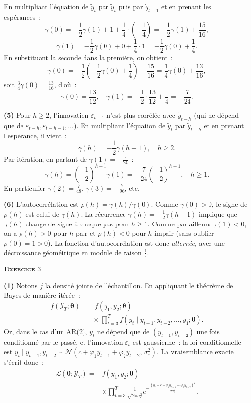 \documentclass[11pt,a4paper,notitlepage]{article}
\newcommand{\exercice}[1]{\textsc{\textbf{Exercice}} #1}
\newcommand{\question}[1]{\textbf{(#1)}}
\begin{document}
En multipliant l'équation de $\tilde y_t$ par $\tilde y_t$ puis par
$\tilde y_{t-1}$ et en prenant les espérances~:
\[
\gamma(0) = -\frac{1}{2}\gamma(1) + 1 + \frac{1}{4}\cdot\left(-\frac{1}{4}\right)
= -\frac{1}{2}\gamma(1) + \frac{15}{16},
\]
\[
\gamma(1) = -\frac{1}{2}\gamma(0) + 0 + \frac{1}{4}\cdot 1
= -\frac{1}{2}\gamma(0) + \frac{1}{4}.
\]
En substituant la seconde dans la première, on obtient~:
\[
\gamma(0) = -\frac{1}{2}\left(-\frac{1}{2}\gamma(0)+\frac{1}{4}\right) + \frac{15}{16}
= \frac{1}{4}\gamma(0) + \frac{13}{16},
\]
soit $\frac{3}{4}\gamma(0) = \frac{13}{16}$, d'où~:
\[
\gamma(0) = \frac{13}{12},\quad
\gamma(1) = -\frac{1}{2}\cdot\frac{13}{12} + \frac{1}{4} = -\frac{7}{24}.
\]
\newline

\question{5} Pour $h\geq 2$, l'innovation $\varepsilon_{t-1}$ n'est
plus corrélée avec $\tilde y_{t-h}$ (qui ne dépend que de
$\varepsilon_{t-h},\varepsilon_{t-h-1},\dots$). En multipliant
l'équation de $\tilde y_t$ par $\tilde y_{t-h}$ et en prenant
l'espérance, il vient~:
\[
\gamma(h) = -\frac{1}{2}\gamma(h-1),\quad h\geq 2.
\]
Par itération, en partant de $\gamma(1)=-\frac{7}{24}$~:
\[
\gamma(h) = \left(-\frac{1}{2}\right)^{h-1}\gamma(1)
= -\frac{7}{24}\left(-\frac{1}{2}\right)^{h-1}, \quad h\geq 1.
\]
En particulier $\gamma(2) = \frac{7}{48}$, $\gamma(3) = -\frac{7}{96}$, etc.\newline

\question{6} L'autocorrélation est $\rho(h) =
\gamma(h)/\gamma(0)$. Comme $\gamma(0)>0$, le signe de $\rho(h)$ est
celui de $\gamma(h)$. La récurrence $\gamma(h) = -\frac{1}{2}\gamma(h-1)$
implique que $\gamma(h)$ change de signe à chaque pas pour $h\geq 1$.
Comme par ailleurs $\gamma(1)<0$, on a $\rho(h)>0$ pour $h$ pair et
$\rho(h)<0$ pour $h$ impair (sans oublier $\rho(0)=1>0$). La fonction
d'autocorrélation est donc \textit{alternée}, avec une décroissance
géométrique en module de raison $\frac{1}{2}$.

\bigskip

\exercice{3}\newline

\question{1} Notons $f$ la densité jointe de l'échantillon. En
appliquant le théorème de Bayes de manière itérée~:
\[
\begin{split}
f(\mathcal Y_T;\bm\theta) &= f(y_1,y_2;\bm\theta)\\
&\quad\times \prod_{t=3}^T f(y_t \mid y_{t-1},y_{t-2},\dots,y_1;\bm\theta).
\end{split}
\]
Or, dans le cas d'un AR(2), $y_t$ ne dépend que de
$(y_{t-1},y_{t-2})$ une fois conditionné par le passé, et l'innovation
$\varepsilon_t$ est gaussienne~: la loi conditionnelle est
$y_t\mid y_{t-1},y_{t-2} \sim \mathcal N(c+\varphi_1
y_{t-1}+\varphi_2 y_{t-2},\,\sigma_{\varepsilon}^2)$. La vraisemblance
exacte s'écrit donc~:
\[
\begin{split}
\mathcal L(\bm\theta;\mathcal Y_T) = & f(y_1,y_2;\bm\theta)\\
& \times \prod_{t=3}^T \frac{1}{\sqrt{2\pi\sigma_{\varepsilon}^2}}
e^{-\frac{(y_t - c - \varphi_1 y_{t-1} - \varphi_2 y_{t-2})^2}{2\sigma_{\varepsilon}^2}}.
\end{split}
\]
\end{document}
